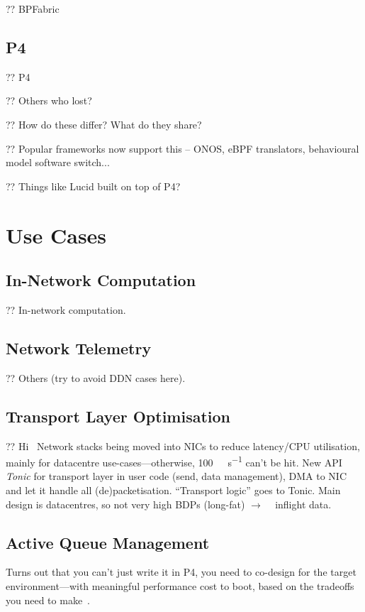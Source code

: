 ?? BPFabric

\subsection{P4}
?? P4

?? Others who lost?

?? How do these differ? What do they share?

?? Popular frameworks now support this -- ONOS, eBPF translators, behavioural model software switch...

?? Things like Lucid built on top of P4?~\parencite{DBLP:conf/sigcomm/SonchackLRW21}

\section{Use Cases}

\subsection{In-Network Computation}
?? In-network computation.

\subsection{Network Telemetry}
?? Others (try to avoid DDN cases here).

\subsection{Transport Layer Optimisation}
?? Hi~\parencite{DBLP:conf/nsdi/ArashlooLGRWW20} Network stacks being moved into NICs to reduce latency/CPU utilisation, mainly for datacentre use-cases---otherwise, \SI{100}{\giga\bit\per\second} can't be hit. New API \emph{Tonic} for transport layer in user code (send, data management), DMA to NIC and let it handle all (de)packetisation. ``Transport logic'' goes to Tonic. Main design is datacentres, so not very high BDPs (long-fat) $\rightarrow$ \si{\kilo\byte} inflight data.

\subsection{Active Queue Management}
Turns out that you can't just write it in P4, you need to co-design for the target environment---with meaningful performance cost to boot, based on the tradeoffs you need to make~\parencite{Kunze-P4-AQM}.

